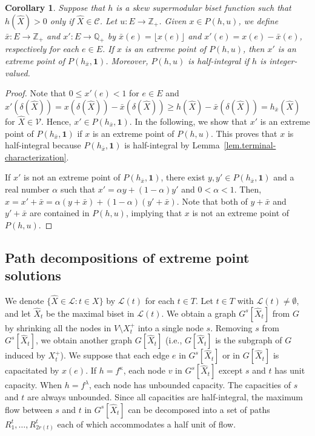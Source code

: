 \documentclass{article}
\newtheorem{corollary}{Corollary}
\newcommand{\Cfam}{\mathcal{C}}
\newcommand{\Vfam}{\mathcal{V}}
\newcommand{\Lfam}{\mathcal{L}}
\newcommand{\Zset}{\mathbb{Z}}
\newcommand{\Rset}{\mathbb{Q}}
\newcommand{\allone}{\mathbf{1}}
\newcommand{\cut}{P}
\newcommand{\f}{f^{\kappa}}
\newcommand{\g}{f^{\lambda}}
\begin{document}
\begin{corollary}\label{cor.half-integrality}
Suppose that $h$ is a skew supermodular biset function such that $h(\hat{X})>0$ 
only if $\hat{X} \in \Cfam$. Let $u \colon E \rightarrow \Zset_+$.
Given $x \in \cut(h,u)$, we define 
$\bar{x}\colon E \rightarrow \Zset_+$ and $x' \colon E \rightarrow \Rset_+$ 
by $\bar{x}(e)=\lfloor x(e) \rfloor$ 
and $x'(e)=x(e)-\bar{x}(e)$, respectively for each $e \in E$.
If $x$ is an extreme point of $\cut(h,u)$,
then $x'$ is an extreme point of $\cut(h_{\bar{x}},\allone)$.
Moreover, $\cut(h,u)$ is half-integral if $h$ is integer-valued.
\end{corollary}
\begin{proof}
Note that $0\leq x'(e) < 1$ for $e \in E$
and $x'(\delta(\hat{X}))
=x(\delta(\hat{X}))-\bar{x}(\delta(\hat{X}))
\geq h(\hat{X})-\bar{x}(\delta(\hat{X}))=h_{\bar{x}}(\hat{X})$
for $\hat{X} \in \Vfam$.
Hence, $x' \in \cut(h_{\bar{x}},\allone)$.
In the following, we show that $x'$ is an extreme point of $\cut(h_{\bar{x}},\allone)$
if $x$ is an extreme point of $\cut(h,u)$.
This proves that $x$ is half-integral because
$\cut(h_{\bar{x}},\allone)$ is half-integral by Lemma~\ref{lem.terminal-characterization}.

If $x'$ is not an extreme point of 
$\cut(h_{\bar{x}},\allone)$, there exist $y,y' \in \cut(h_{\bar{x}},\allone)$ 
and a real number $\alpha$
such that $x'=\alpha y + (1- \alpha)y'$ and $0 < \alpha < 1$.
Then, $x=x'+\bar{x}=\alpha (y+\bar{x}) + (1- \alpha)(y'+\bar{x})$.
Note that both of $y+\bar{x}$ and $y'+\bar{x}$ are contained in $\cut(h,u)$,
implying that $x$ is not an extreme point of $\cut(h,u)$.
\end{proof}

\subsection{Path decompositions of extreme point solutions} 
\label{subsec.path-decomp}

We denote $\{\hat{X} \in \Lfam \colon t \in X\}$ by $\Lfam(t)$ for each $t \in T$.
Let $t \in T$ with $\Lfam(t) \neq \emptyset$,
and let $\hat{X}_t$ be the maximal biset in $\Lfam(t)$. 
We obtain a graph $G^s[\hat{X}_t]$ 
from $G$ by shrinking all the nodes in $V\setminus X^+_t$ into a single node $s$.
Removing $s$ from $G^s[\hat{X}_t]$,
we obtain another graph $G[\hat{X}_t]$
(i.e., $G[\hat{X}_t]$ is the subgraph of $G$ induced by $X^+_t$).
We suppose that each edge $e$ in 
$G^s[\hat{X}_t]$ or in $G[\hat{X}_t]$ is capacitated by $x(e)$.
If $h=\f$, 
each node $v$ in $G^s[\hat{X}_t]$ except $s$ and $t$ has
unit capacity. When $h=\g$,
each node has unbounded capacity.
The capacities of $s$ and $t$ are always unbounded.
Since all capacities are half-integral, the maximum flow 
between $s$ and $t$ in $G^s[\hat{X}_t]$
can be decomposed into a set of paths 
$R^t_1,\ldots,R^t_{2r(t)}$ each of which accommodates a half unit of flow. 
\end{document}
